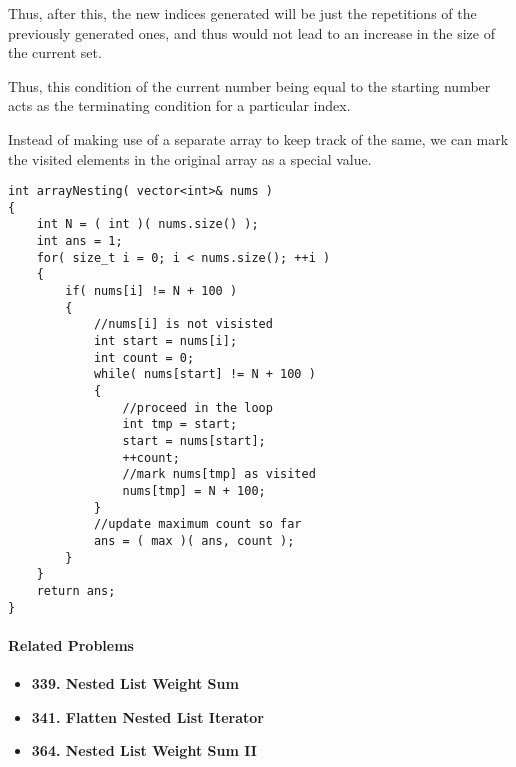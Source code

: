 Thus, after this, the new indices generated will be just the repetitions of the previously generated ones, and thus would not lead to an increase in the size of the current set.

Thus, this condition of the current number being equal to the starting number acts as the terminating condition for a particular index.

Instead of making use of a separate array to keep track of the same, we can mark the visited elements in the original array as a special value.

\setcounter{lstlisting}{0}
\begin{lstlisting}[style=customc, caption={Visited Array}]
int arrayNesting( vector<int>& nums )
{
    int N = ( int )( nums.size() );
    int ans = 1;
    for( size_t i = 0; i < nums.size(); ++i )
    {
        if( nums[i] != N + 100 )
        {
            //nums[i] is not visisted
            int start = nums[i];
            int count = 0;
            while( nums[start] != N + 100 )
            {
                //proceed in the loop
                int tmp = start;
                start = nums[start];
                ++count;
                //mark nums[tmp] as visited
                nums[tmp] = N + 100;
            }
            //update maximum count so far
            ans = ( max )( ans, count );
        }
    }
    return ans;
}
\end{lstlisting}

\paragraph{Related Problems}
\begin{itemize}
\item \textbf{339. Nested List Weight Sum}
\item \textbf{341. Flatten Nested List Iterator}
\item \textbf{364. Nested List Weight Sum II}
\end{itemize}